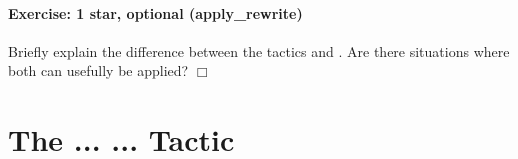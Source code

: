 \documentclass[12pt]{report}
\begin{document}
\paragraph{Exercise: 1 star, optional (apply\_rewrite)}

 Briefly explain the difference between the tactics  and
    .  Are there situations where both can usefully be
    applied?
   \ensuremath{\Box} \begin{coqdoccode}
\coqdocemptyline
\end{coqdoccode}
\section{The \texorpdfstring{\protect{}}{apply} ... \texorpdfstring{\protect{}}{with} ... Tactic}
\end{document}
